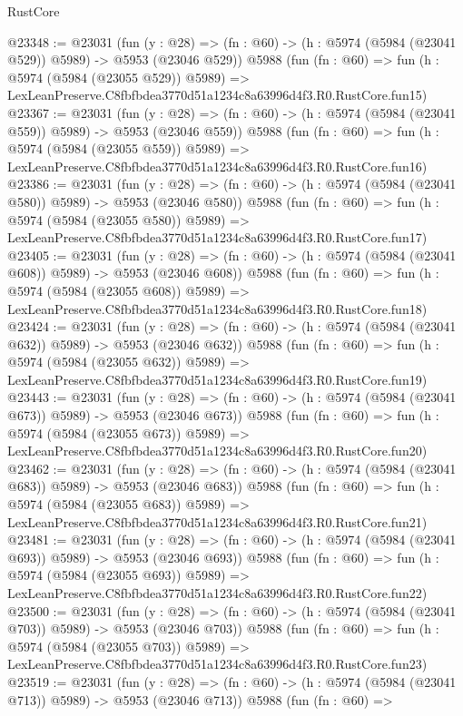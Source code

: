 \begin{lexlean}{RustCore}
\begin{coremodule}
@23348 := @23031
    (fun (y : @28) => (fn : @60) -> (h : @5974 (@5984 (@23041 @529)) @5989) -> @5953 (@23046 @529))
    @5988
    (fun (fn : @60) =>
    fun (h : @5974 (@5984 (@23055 @529)) @5989) =>
    LexLeanPreserve.C8fbfbdea3770d51a1234c8a63996d4f3.R0.RustCore.fun15)
@23367 := @23031
    (fun (y : @28) => (fn : @60) -> (h : @5974 (@5984 (@23041 @559)) @5989) -> @5953 (@23046 @559))
    @5988
    (fun (fn : @60) =>
    fun (h : @5974 (@5984 (@23055 @559)) @5989) =>
    LexLeanPreserve.C8fbfbdea3770d51a1234c8a63996d4f3.R0.RustCore.fun16)
@23386 := @23031
    (fun (y : @28) => (fn : @60) -> (h : @5974 (@5984 (@23041 @580)) @5989) -> @5953 (@23046 @580))
    @5988
    (fun (fn : @60) =>
    fun (h : @5974 (@5984 (@23055 @580)) @5989) =>
    LexLeanPreserve.C8fbfbdea3770d51a1234c8a63996d4f3.R0.RustCore.fun17)
@23405 := @23031
    (fun (y : @28) => (fn : @60) -> (h : @5974 (@5984 (@23041 @608)) @5989) -> @5953 (@23046 @608))
    @5988
    (fun (fn : @60) =>
    fun (h : @5974 (@5984 (@23055 @608)) @5989) =>
    LexLeanPreserve.C8fbfbdea3770d51a1234c8a63996d4f3.R0.RustCore.fun18)
@23424 := @23031
    (fun (y : @28) => (fn : @60) -> (h : @5974 (@5984 (@23041 @632)) @5989) -> @5953 (@23046 @632))
    @5988
    (fun (fn : @60) =>
    fun (h : @5974 (@5984 (@23055 @632)) @5989) =>
    LexLeanPreserve.C8fbfbdea3770d51a1234c8a63996d4f3.R0.RustCore.fun19)
@23443 := @23031
    (fun (y : @28) => (fn : @60) -> (h : @5974 (@5984 (@23041 @673)) @5989) -> @5953 (@23046 @673))
    @5988
    (fun (fn : @60) =>
    fun (h : @5974 (@5984 (@23055 @673)) @5989) =>
    LexLeanPreserve.C8fbfbdea3770d51a1234c8a63996d4f3.R0.RustCore.fun20)
@23462 := @23031
    (fun (y : @28) => (fn : @60) -> (h : @5974 (@5984 (@23041 @683)) @5989) -> @5953 (@23046 @683))
    @5988
    (fun (fn : @60) =>
    fun (h : @5974 (@5984 (@23055 @683)) @5989) =>
    LexLeanPreserve.C8fbfbdea3770d51a1234c8a63996d4f3.R0.RustCore.fun21)
@23481 := @23031
    (fun (y : @28) => (fn : @60) -> (h : @5974 (@5984 (@23041 @693)) @5989) -> @5953 (@23046 @693))
    @5988
    (fun (fn : @60) =>
    fun (h : @5974 (@5984 (@23055 @693)) @5989) =>
    LexLeanPreserve.C8fbfbdea3770d51a1234c8a63996d4f3.R0.RustCore.fun22)
@23500 := @23031
    (fun (y : @28) => (fn : @60) -> (h : @5974 (@5984 (@23041 @703)) @5989) -> @5953 (@23046 @703))
    @5988
    (fun (fn : @60) =>
    fun (h : @5974 (@5984 (@23055 @703)) @5989) =>
    LexLeanPreserve.C8fbfbdea3770d51a1234c8a63996d4f3.R0.RustCore.fun23)
@23519 := @23031
    (fun (y : @28) => (fn : @60) -> (h : @5974 (@5984 (@23041 @713)) @5989) -> @5953 (@23046 @713))
    @5988
    (fun (fn : @60) =>

\end{coremodule}
\end{lexlean}
